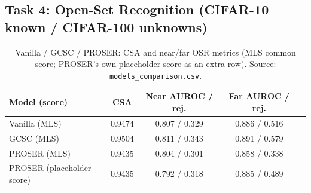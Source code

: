 \documentclass{article}
\begin{document}
\FloatBarrier
\subsection{Task 4: Open-Set Recognition (CIFAR-10 known / CIFAR-100 unknowns)}

\begin{table}[h]
  \centering
  \caption{MSP / MLS / Energy / Mahalanobis on the frozen vanilla model. Source: \texttt{scores\_comparison\_vanilla.csv}.}
  \label{tab:task4-scores}
  \small
\end{table}

\begin{table}[h]
  \centering
  \caption{Vanilla / GCSC / PROSER: CSA and near/far OSR metrics (MLS common score; PROSER's own placeholder score as an extra row). Source: \texttt{models\_comparison.csv}.}
  \label{tab:task4-models}
  \small
  \begin{tabular}{lcccc}
    \toprule
    Model (score) & CSA & Near AUROC / rej. & Far AUROC / rej. \\
    \midrule
    Vanilla (MLS)              & 0.9474 & 0.807 / 0.329 & 0.886 / 0.516 \\
    GCSC (MLS)                 & 0.9504 & 0.811 / 0.343 & 0.891 / 0.579 \\
    PROSER (MLS)               & 0.9435 & 0.804 / 0.301 & 0.858 / 0.338 \\
    PROSER (placeholder score) & 0.9435 & 0.792 / 0.318 & 0.885 / 0.489 \\
    \bottomrule
  \end{tabular}
\end{table}
\end{document}
